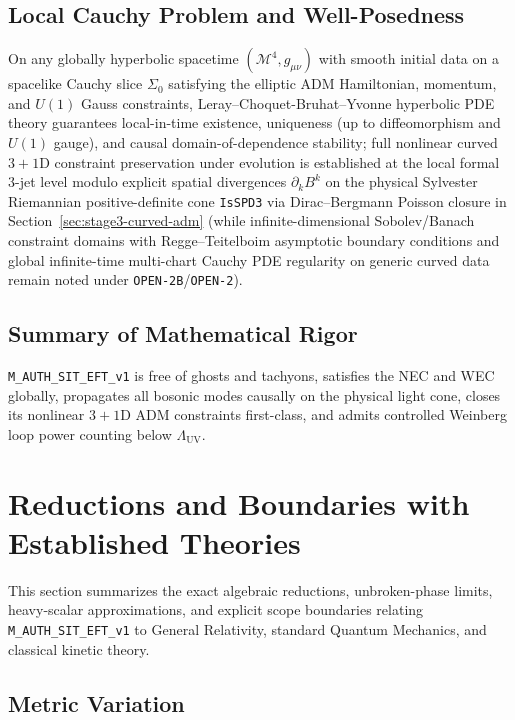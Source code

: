\subsection{Local Cauchy Problem and Well-Posedness}

On any globally hyperbolic spacetime $(\mathcal{M}^4, g_{\mu\nu})$ with smooth initial data on a spacelike Cauchy slice $\Sigma_0$ satisfying the elliptic ADM Hamiltonian, momentum, and $U(1)$ Gauss constraints, Leray--Choquet-Bruhat--Yvonne hyperbolic PDE theory guarantees local-in-time existence, uniqueness (up to diffeomorphism and $U(1)$ gauge), and causal domain-of-dependence stability; full nonlinear curved $3+1$D constraint preservation under evolution is established at the local formal 3-jet level modulo explicit spatial divergences $\partial_k B^k$ on the physical Sylvester Riemannian positive-definite cone \texttt{IsSPD3} via Dirac--Bergmann Poisson closure in Section~\ref{sec:stage3-curved-adm} (while infinite-dimensional Sobolev/Banach constraint domains with Regge--Teitelboim asymptotic boundary conditions and global infinite-time multi-chart Cauchy PDE regularity on generic curved data remain noted under \texttt{OPEN-2B}/\texttt{OPEN-2}).

\subsection{Summary of Mathematical Rigor}

\texttt{M\_AUTH\_SIT\_EFT\_v1} is free of ghosts and tachyons, satisfies the NEC and WEC globally, propagates all bosonic modes causally on the physical light cone, closes its nonlinear $3+1$D ADM constraints first-class, and admits controlled Weinberg loop power counting below $\Lambda_{\mathrm{UV}}$.

\section{Reductions and Boundaries with Established Theories}
\label{app:reductions}

This section summarizes the exact algebraic reductions, unbroken-phase limits, heavy-scalar approximations, and explicit scope boundaries relating \texttt{M\_AUTH\_SIT\_EFT\_v1} to General Relativity, standard Quantum Mechanics, and classical kinetic theory.

\subsection{Metric Variation}


